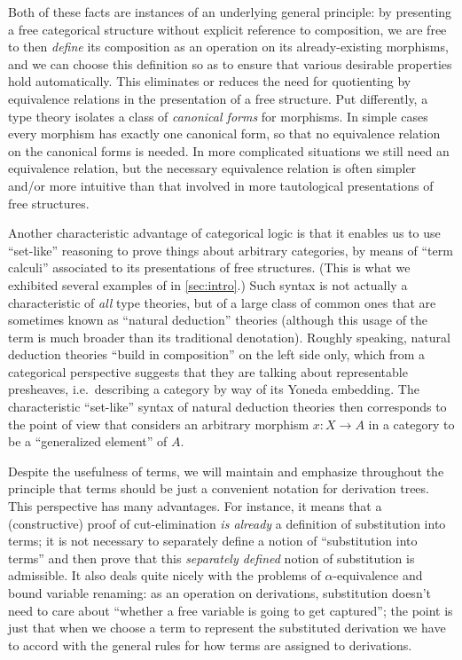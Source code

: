 Both of these facts are instances of an underlying general principle: by presenting a free categorical structure without explicit reference to composition, we are free to then \emph{define} its composition as an operation on its already-existing morphisms, and we can choose this definition so as to ensure that various desirable properties hold automatically.
This eliminates or reduces the need for quotienting by equivalence relations in the presentation of a free structure.
Put differently, a type theory isolates a class of \emph{canonical forms} for morphisms.
In simple cases every morphism has exactly one canonical form, so that no equivalence relation on the canonical forms is needed.
In more complicated situations we still need an equivalence relation, but the necessary equivalence relation is often simpler and/or more intuitive than that involved in more tautological presentations of free structures.

Another characteristic advantage of categorical logic is that it enables us to use ``set-like'' reasoning to prove things about arbitrary categories, by means of ``term calculi'' associated to its presentations of free structures.
(This is what we exhibited several examples of in \cref{sec:intro}.)
Such syntax is not actually a characteristic of \emph{all} type theories, but of a large class of common ones that are sometimes known as ``natural deduction'' theories (although this usage of the term is much broader than its traditional denotation).
Roughly speaking, natural deduction theories ``build in composition'' on the left side only, which from a categorical perspective suggests that they are talking about representable presheaves, i.e.\ describing a category by way of its Yoneda embedding.
The characteristic ``set-like'' syntax of natural deduction theories then corresponds to the point of view that considers an arbitrary morphism $x:X\to A$ in a category to be a ``generalized element'' of $A$.

Despite the usefulness of terms, we will maintain and emphasize throughout the principle that terms should be just a convenient notation for derivation trees.
This perspective has many advantages.
For instance, it means that a (constructive) proof of cut-elimination \emph{is already} a definition of substitution into terms; it is not necessary to separately define a notion of ``substitution into terms'' and then prove that this \emph{separately defined} notion of substitution is admissible.
It also deals quite nicely with the problems of $\alpha$-equivalence and bound variable renaming: as an operation on derivations, substitution doesn't need to care about ``whether a free variable is going to get captured''; the point is just that when we choose a term to represent the substituted derivation we have to accord with the general rules for how terms are assigned to derivations.

